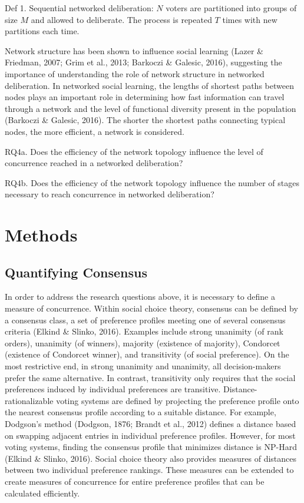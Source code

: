 Def 1. Sequential networked deliberation: $N$ voters are partitioned into groups of size $M$ and allowed to deliberate. The process is repeated $T$ times with new partitions each time.

Network structure has been shown to influence social learning (Lazer \& Friedman, 2007; Grim et al., 2013; Barkoczi \& Galesic, 2016), suggesting the importance of understanding the role of network structure in networked deliberation. In networked social learning, the lengths of shortest paths between nodes plays an important role in determining how fast information can travel through a network and the level of functional diversity present in the population (Barkoczi \& Galesic, 2016). The shorter the shortest paths connecting typical nodes, the more efficient, a network is considered.

RQ4a. Does the efficiency of the network topology influence the level of concurrence reached in a networked deliberation?

RQ4b. Does the efficiency of the network topology influence the number of stages necessary to reach concurrence in networked deliberation?

\section{Methods}\label{sec:methods}
\subsection{Quantifying Consensus}
In order to address the research questions above, it is necessary to define a measure of concurrence. Within social choice theory, consensus can be defined by a consensus class, a set of preference profiles meeting one of several consensus criteria (Elkind \& Slinko, 2016). Examples include strong unanimity (of rank orders), unanimity (of winners), majority (existence of majority), Condorcet (existence of Condorcet winner), and transitivity (of social preference). On the most restrictive end, in strong unanimity and unanimity, all decision-makers prefer the same alternative. In contrast, transitivity only requires that the social preferences induced by individual preferences are transitive. Distance-rationalizable voting systems are defined by projecting the preference profile onto the nearest consensus profile according to a suitable distance. For example, Dodgson's method (Dodgson, 1876; Brandt et al., 2012) defines a distance based on swapping adjacent entries in individual preference profiles. However, for most voting systems, finding the consensus profile that minimizes distance is NP-Hard (Elkind \& Slinko, 2016). Social choice theory also provides measures of distances between two individual preference rankings. These measures can be extended to create measures of concurrence for entire preference profiles that can be calculated efficiently.

